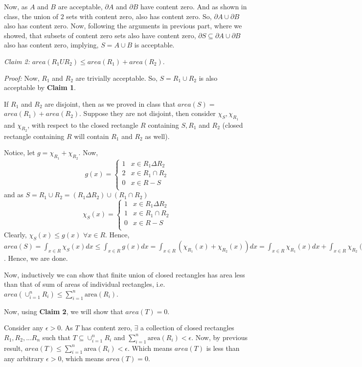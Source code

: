 \documentclass[11pt]{amsart}
\theoremstyle{definition}
\begin{document}
\begin{enumerate}[wide, labelwidth=!, labelindent=0pt]
Now, as $A$ and $B$ are acceptable, $\partial A$ and $\partial B$ have content zero. And as shown in class, the union of $2$ sets with content zero, also has content zero. So, $\partial A \cup \partial B$ also has content zero. Now, following the arguments in previous part, where we showed, that subsets of content zero sets also have content zero, $\partial S \subseteq \partial A \cup \partial B$ also has content zero, implying, $S = A \cup B$ is acceptable.

\textit{Claim 2:} $area(R_1 U R_2) \le area(R_1) + area(R_2)$.

\textit{Proof:} Now, $R_1$ and $R_2$ are trivially acceptable. So, $S = R_1 \cup R_2$ is also acceptable by \textbf{Claim 1}.

If $R_1$ and $R_2$ are disjoint, then as we proved in class that $area(S) = $ $area(R_1) + area(R_2)$. Suppose they are not disjoint, then consider $\chi_{S}, \chi_{R_1}$ and $\chi_{R_2}$, with respect to the closed rectangle $R$ containing $S, R_1$ and $R_2$ (closed rectangle containing $R$ will contain $R_1$ and $R_2$ as well).

Notice, let $g = \chi_{R_1} + \chi_{R_2}$.
Now,
\[
g(x) = 
\begin{cases} 
      1 & x\in R_1 \Delta R_2 \\
      2 & x\in R_1 \cap R_2 \\
      0 & x \in R-S\\
\end{cases}
\]
and as $S = R_1 \cup R_2 = (R_1 \Delta R_2) \cup (R_1 \cap R_2)$
\[
\chi_{S}(x) = 
\begin{cases} 
      1 & x\in R_1 \Delta R_2 \\
      1 & x\in R_1 \cap R_2 \\
      0 & x \in R-S\\
\end{cases}
\]
Clearly, $\chi_S(x) \le g(x)$ $\forall x \in R$. Hence, $area(S) = \int_{x \in R} \chi_S(x) dx \le \int_{x \in R} g(x) dx = \int_{x \in R} (\chi_{R_1}(x) + \chi_{R_2}(x)) dx = \int_{x \in R} \chi_{R_1}(x) dx + \int_{x \in R} \chi_{R_2}(x) dx = area(R_1) + area(R_2)$. Hence, we are done.

Now, inductively we can show that finite union of closed rectangles has area less than that of sum of areas of individual rectangles, i.e. $area(\cup_{i=1}^{n} R_i) \le \sum_{i=1}^{n} \text{area}(R_i)$.

Now, using \textbf{Claim 2}, we will show that $area(T) = 0$.

Consider any $\epsilon > 0$. As $T$ has content zero, $\exists$ a collection of closed rectangles $R_1, R_2,...R_n$ such that $T \subseteq \cup_{i = 1}^{n} R_i$ and $\sum_{i=1}^{n} \text{area}(R_i) < \epsilon$. Now, by previous result, $area(T) \le \sum_{i=1}^{n} \text{area}(R_i) < \epsilon$. Which means $area(T)$ is less than any arbitrary $\epsilon >0$, which means $area(T) = 0$.


\end{enumerate}
\end{document}

